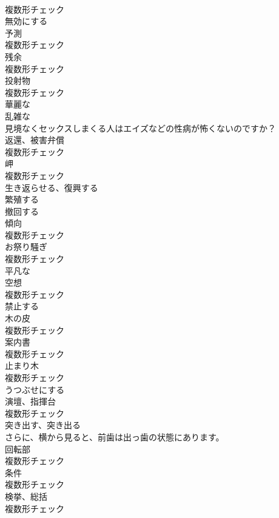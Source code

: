 \documentclass[8pt]{extreport}
\begin{document}
\begin{CJK}{UTF8}{min}
\\	複数形チェック
\\	[動詞]	無効にする	
\\	[名詞]	予測	
\\	複数形チェック
\\	[名詞]	残余	
\\	複数形チェック
\\	[名詞]	投射物	
\\	複数形チェック
\\	[形容詞]	華麗な	
\\	[形容詞]	乱雑な	
\\	見境なくセックスしまくる人はエイズなどの性病が怖くないのですか？	
\\	[名詞]	返還、被害弁償	
\\	複数形チェック
\\	[名詞]	岬	
\\	複数形チェック
\\	[動詞]	生き返らせる、復興する	
\\	[動詞]	繁殖する	
\\	[動詞]	撤回する	
\\	[名詞]	傾向	
\\	複数形チェック
\\	[名詞]	お祭り騒ぎ	
\\	複数形チェック
\\	[形容詞]	平凡な	
\\	[名詞]	空想	
\\	複数形チェック
\\	[動詞]	禁止する	
\\	[名詞]	木の皮	
\\	複数形チェック
\\	[名詞]	案内書	
\\	複数形チェック
\\	[名詞]	止まり木	
\\	複数形チェック
\\	[動詞]	うつぶせにする	
\\	[名詞]	演壇、指揮台	
\\	複数形チェック
\\	[動詞]	突き出す、突き出る	
\\	さらに、横から見ると、前歯は出っ歯の状態にあります。	
\\	[名詞]	回転部	
\\	複数形チェック
\\	[名詞]	条件	
\\	複数形チェック
\\	[名詞]	検挙、総括	
\\	複数形チェック

\end{CJK}
\end{document}
